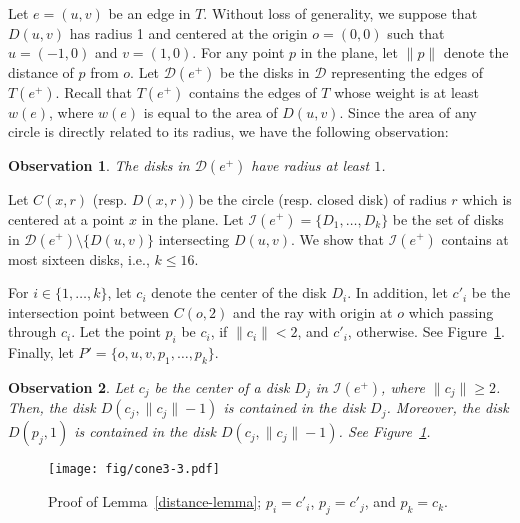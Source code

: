 \documentclass[11pt,a4paper]{article}
\newcommand{\cmin}{D(u,v)}
\newtheorem{observation}{Observation}
\begin{document}
Let $e=(u,v)$ be an edge in $T$. Without loss of generality, we suppose that $D(u,v)$ has radius 1 and centered at the origin $o=(0,0)$ such that $u=(-1,0)$ and $v=(1,0)$. For any point $p$ in the plane, let $\|p\|$ denote the distance of $p$ from $o$. Let $\mathcal{D}(e^+)$ be the disks in $\mathcal{D}$ representing the edges of $T(e^+)$. Recall that $T(e^+)$ contains the edges of $T$ whose weight is at least $w(e)$, where $w(e)$ is equal to the area of $\cmin$. Since the area of any circle is directly related to its radius, we have the following observation:

\begin{observation}
 \label{radius-one}
The disks in $\mathcal{D}(e^+)$ have radius at least $1$.
\end{observation}

Let $C(x,r)$ (resp. $D(x,r)$) be the circle (resp. closed disk) of radius $r$ which is centered at a point $x$ in the plane. 
Let $\mathcal{I}(e^+)=\{D_1,\dots, D_k\}$ be the set of disks in $\mathcal{D}(e^+)\setminus\{D(u,v)\}$ intersecting $D(u,v)$. We show that $\mathcal{I}(e^+)$ contains at most sixteen disks, i.e., $k\le 16$.

For $i\in\{1,\dots,k\}$, let $c_i$ denote the center of the disk $D_i$. 
In addition, let $c'_i$ be the intersection point between $C(o,2)$ and the ray with origin at $o$ which passing through $c_i$. Let the point $p_i$ be $c_i$, if $\|c_i\|< 2$, and $c'_i$, otherwise. See Figure~\ref{distance-fig}. Finally, let $P'=\{o, u, v, p_1,\dots,p_k\}$. 

\begin{observation}
\label{obs}
Let $c_j$ be the center of a disk $D_j$ in $\mathcal{I}(e^+)$, where $\|c_j\|\ge 2$. Then, the disk $D(c_j, \|c_j\|-1)$ is contained in the disk $D_j$. Moreover, the disk $D(p_j,1)$ is contained in the disk $D(c_j, \|c_j\|-1)$. See Figure~\ref{distance-fig}.
\end{observation}

\begin{figure}[htb]
  \centering
  \texttt{[image: fig/cone3-3.pdf]}
 \caption{Proof of Lemma~\ref{distance-lemma}; $p_i=c'_i$, $p_j=c'_j$, and $p_k=c_k$.}
  \label{distance-fig}
\end{figure}
\end{document}
